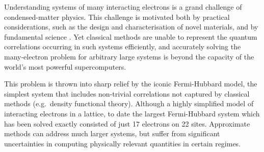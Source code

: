 \documentclass[aps,prb,twoside,superscriptaddress,longbibliography,nofootinbib,floatfix, notitlepage,twocolumn]{revtex4-1}
\begin{document}
Understanding systems of many interacting electrons is a grand challenge of condensed-matter physics\cite{leblanc15}. This challenge is motivated both by practical considerations, such as the design and characterisation of novel materials\cite{scalapino2012}, and by fundamental science \cite{scalapino07,Arovas_review2021,Qin_review2021}. Yet classical methods are unable to represent the quantum correlations occurring in such systems efficiently, and accurately solving the many-electron problem for arbitrary large systems is beyond the capacity of the world's most powerful supercomputers.

This problem is thrown into sharp relief by the iconic Fermi-Hubbard model\cite{hubbard63,hubbard13}, the simplest system that includes non-trivial correlations not captured by classical methods (e.g.\ density functional theory). Although a highly simplified model of interacting electrons in a lattice, to date the largest Fermi-Hubbard system which has been solved exactly consisted of just 17 electrons on 22 sites\cite{yamada05}. Approximate methods can address much larger systems, but suffer from significant uncertainties in computing physically relevant quantities in certain regimes\cite{leblanc15}.
\end{document}
